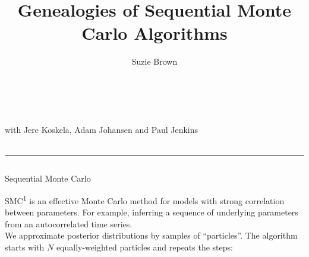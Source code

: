 \documentclass[final, 12pt]{beamer}
\title{Genealogies of Sequential Monte Carlo Algorithms}
\author{Suzie Brown}
\institute{Department of Statistics, University of Warwick}
\date{}
\newlength{\colwidth}
\begin{document}
\begin{frame}

\vspace*{-35pt}

\centering
{}

\vspace*{-220pt}

\huge{\inserttitle}\\[2pt]
\Large{\insertauthor}\\[7pt]
\large{with Jere Koskela, Adam Johansen and Paul Jenkins}\\[7pt]
\normalsize{\insertinstitute}\\[25pt]
\hrule

\vspace*{15pt}

\begin{columns}
\begin{column}{\colwidth}
\begin{block}{Sequential Monte Carlo}

SMC\textsuperscript{1} is an effective Monte Carlo method for models with strong correlation between parameters. For example, inferring a sequence of underlying parameters from an autocorrelated time series.\\[12pt]

We approximate posterior distributions by samples of ``particles''. The algorithm starts with $N$ equally-weighted particles and repeats the steps:
\begin{center}
\end{center}
\end{block}
\end{column}
\end{columns}
\end{frame}
\end{document}
